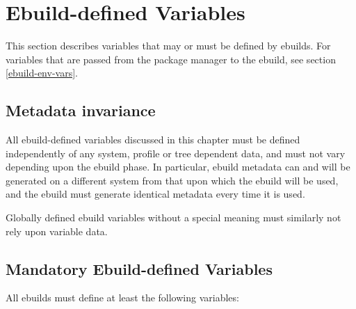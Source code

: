 \chapter{Ebuild-defined Variables}
\label{ebuild-vars}

\note This section describes variables that may or must be defined by ebuilds. For
variables that are passed from the package manager to the ebuild, see section \ref{ebuild-env-vars}.

\section{Metadata invariance}
\label{metadata-invariance}

All ebuild-defined variables discussed in this chapter must be defined independently of
any system, profile or tree dependent data, and must not vary depending upon the ebuild
phase. In particular, ebuild metadata can and will be generated on a different system from that upon
which the ebuild will be used, and the ebuild must generate identical metadata every time it
is used.

Globally defined ebuild variables without a special meaning must similarly not rely upon
variable data.

\section{Mandatory Ebuild-defined Variables}

All ebuilds must define at least the following variables:

